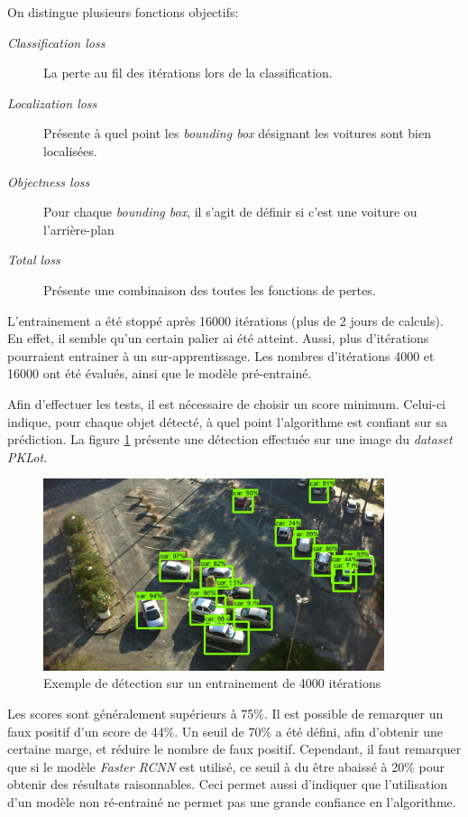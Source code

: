 On distingue plusieurs fonctions objectifs:
\begin{description}
    \item[\textit{Classification loss}] La perte au fil des itérations lors de la classification. 
    \item[\textit{Localization loss}] Présente à quel point les \textit{bounding box} désignant les voitures sont bien localisées.
    \item[\textit{Objectness loss}] Pour chaque \textit{bounding box}, il s'agit de définir si c'est une voiture ou l'arrière-plan
    \item[\textit{Total loss}] Présente une combinaison des toutes les fonctions de pertes.
\end{description}

L'entrainement a été stoppé après 16000 itérations (plus de 2 jours de calculs). En effet, il semble qu'un certain palier ai été atteint. Aussi, plus d'itérations pourraient entrainer à un sur-apprentissage. Les nombres d'itérations 4000 et 16000 ont été évalués, ainsi que le modèle pré-entrainé.

Afin d'effectuer les tests, il est nécessaire de choisir un score minimum. Celui-ci indique, pour chaque objet détecté, à quel point l'algorithme est confiant sur sa prédiction. La figure \ref{fig:tensorflow_bb} présente une détection effectuée sur une image du \textit{dataset} \textit{PKLot}. 

\begin{figure}[ht]
    \includegraphics[width=10cm]{img/tests/tensorflow_bb.jpg}
    \centering
    \caption{Exemple de détection sur un entrainement de 4000 itérations}
    \label{fig:tensorflow_bb}
\end{figure} 

Les scores sont généralement supérieurs à 75\%. Il est possible de remarquer un faux positif d'un score de 44\%. Un seuil de 70\% a été défini, afin d'obtenir une certaine marge, et réduire le nombre de faux positif. Cependant, il faut remarquer que si le modèle \textit{Faster RCNN} est utilisé, ce seuil à du être abaissé à 20\% pour obtenir des résultats raisonnables. Ceci permet aussi d'indiquer que l'utilisation d'un modèle non ré-entrainé ne permet pas une grande confiance en l'algorithme.

